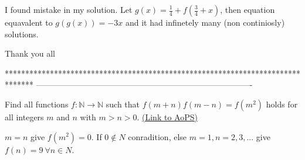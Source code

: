 \begin{mysolution}
	I found mistake in my solution.
Let $ g(x)=\frac{1}{4}+f(\frac{3}{4}+x)$, then equation equavalent to $ g(g(x))=-3x$ and it had infinetely many (non continiosly) solutions.
\end{mysolution}



\begin{mysolution}
	Thank you all
\end{mysolution}
*******************************************************************************
-------------------------------------------------------------------------------

\begin{problem}
	Find all functions $ f:\mathbb{N}\rightarrow\mathbb{N}$ such that $f(m+n)f(m-n) =f(m^{2})$ holds for all integers $m$ and $n$ with $m>n>0$.
	\flushright \href{https://artofproblemsolving.com/community/c6h168059}{(Link to AoPS)}
\end{problem}



\begin{mysolution}
	$ m=n$ give $ f(m^{2})=0$. If $ 0\not\in N$ conradition, else $ m=1, n=2,3,...$ give $ f(n)=9\ \forall n\in N$.
\end{mysolution}



